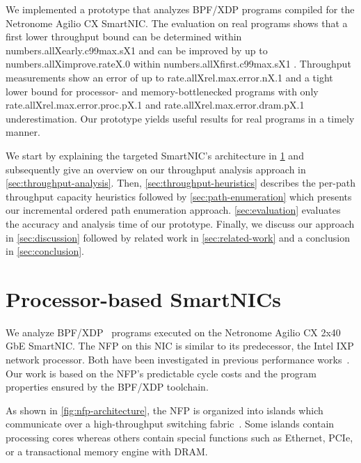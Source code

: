 \documentclass[10pt,letterpaper,sigconf,anonymous,nonacm,screen]{acmart}
\newcommand{\afblock}[1]{\noindent{\textbf{#1.}}}
\newcommand{\mdata}[3]{%
	\csname #1X#2X#3\endcsname%
}
\newcommand{\islandcolor}[1]{\textcolor{RWTHblau}{#1}}
\newcommand{\corecolor}[1]{\textcolor{RWTHgrun}{#1}}
\newcommand{\dramcolor}[1]{\textcolor{RWTHturkis!50}{#1}}
\newcommand{\fabriccolor}[1]{\textcolor{RWTHmagenta!50}{#1}}
\begin{document}
We implemented a prototype that analyzes BPF/XDP programs compiled for the Netronome Agilio CX SmartNIC.
The evaluation on real programs shows that a first lower throughput bound can be determined within \mdata{numbers.all}{early.c99max.s}{1} and can be improved by up to \mdata{numbers.all}{improve.rate}{.0} within \mdata{numbers.all}{first.c99max.s}{1}.
Throughput measurements show an error of up to \mdata{rate.all}{rel.max.error.n}{.1} and a tight lower bound for processor- and memory-bottlenecked programs with only \mdata{rate.all}{rel.max.error.proc.p}{.1} and \mdata{rate.all}{rel.max.error.dram.p}{.1} underestimation.
Our prototype yields useful results for real programs in a timely manner.

\afblock{Structure}
We start by explaining the targeted SmartNIC's architecture in \ref{sec:background} and subsequently give an overview on our throughput analysis approach in \ref{sec:throughput-analysis}.
Then, \ref{sec:throughput-heuristics} describes the per-path throughput capacity heuristics followed by \ref{sec:path-enumeration} which presents our incremental ordered path enumeration approach.
\ref{sec:evaluation} evaluates the accuracy and analysis time of our prototype.
Finally, we discuss our approach in \ref{sec:discussion} followed by related work in \ref{sec:related-work} and a conclusion in \ref{sec:conclusion}.


\section{Processor-based SmartNICs}
\label{sec:background}

We analyze BPF/XDP~\cite{XDP-offload,XDP} programs executed on the Netronome Agilio CX 2x40 GbE SmartNIC.
The \ac{NFP} on this NIC is similar to its predecessor, the Intel IXP network processor.
Both have been investigated in previous performance works~\cite{shangri-la,nova,ixp-partitioning,xdp-performance,p4-performance,clara,pcie-performance}.
Our work is based on the \ac{NFP}'s predictable cycle costs and the program properties ensured by the BPF/XDP toolchain.

\afblock{Islands}
As shown in \ref{fig:nfp-architecture}, the \ac{NFP} is organized into \islandcolor{islands} which communicate over a high-throughput \fabriccolor{switching fabric}~\cite{XDP-offload,composable-silicon,joy-of-micro-c}.
Some \islandcolor{islands} contain \corecolor{processing cores} whereas others contain special functions such as Ethernet, PCIe, or a transactional memory engine with \dramcolor{DRAM}.
\end{document}
